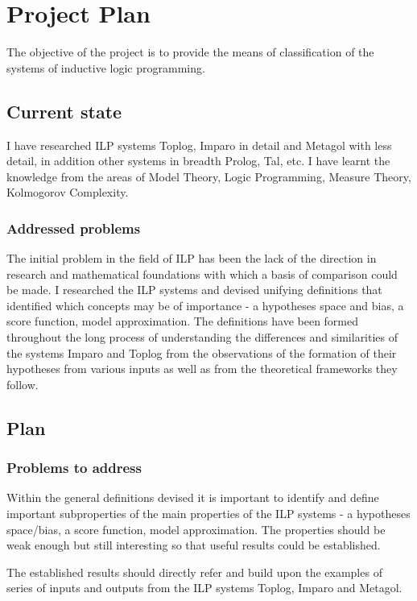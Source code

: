 \chapter{Project Plan}
The objective of the project is to provide the means of classification of the systems of inductive logic programming.

\section{Current state}
I have researched ILP systems Toplog, Imparo in detail and Metagol with less detail, in addition other systems in breadth Prolog, Tal, etc. I have learnt the knowledge from the areas of Model Theory, Logic Programming, Measure Theory, Kolmogorov Complexity.

\subsection{Addressed problems}
The initial problem in the field of ILP has been the lack of the direction in research and mathematical foundations with which a basis of comparison could be made. I researched the ILP systems and devised unifying definitions that identified which concepts may be of importance - a hypotheses space and bias, a score function, model approximation. The definitions have been formed throughout the long process of understanding the differences and similarities of the systems Imparo and Toplog from the observations of the formation of their hypotheses from various inputs as well as from the theoretical frameworks they follow.

\section{Plan}

\subsection{Problems to address}
Within the general definitions devised it is important to identify and define important subproperties of the main properties of the ILP systems - a hypotheses space/bias, a score function, model approximation. The properties should be weak enough but still interesting so that useful results could be established.

The established results should directly refer and build upon the examples of series of inputs and outputs from the ILP systems Toplog, Imparo and Metagol.

